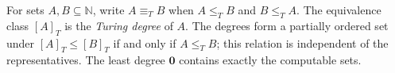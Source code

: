 
For sets $A,B\subseteq\mathbb N$, write $A\equiv_T B$ when $A\le_T B$ and $B\le_T A$. The equivalence class $[A]_T$ is the \emph{Turing degree} of $A$. The degrees form a partially ordered set under $[A]_T\le[B]_T$ if and only if $A\le_T B$; this relation is independent of the representatives. The least degree $\mathbf 0$ contains exactly the computable sets.
